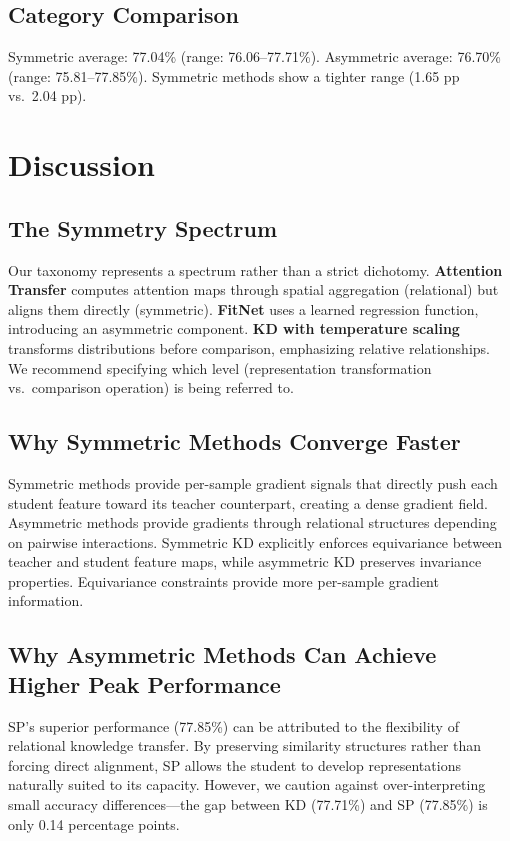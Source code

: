 \documentclass[symmetry,article,submit,moreauthors]{Definitions/mdpi}
\begin{document}
\subsection{Category Comparison}

Symmetric average: 77.04\% (range: 76.06--77.71\%). Asymmetric average: 76.70\% (range: 75.81--77.85\%). Symmetric methods show a tighter range (1.65 pp vs.\ 2.04 pp).

\section{Discussion}
\label{sec:discussion}

\subsection{The Symmetry Spectrum}

Our taxonomy represents a spectrum rather than a strict dichotomy. \textbf{Attention Transfer} computes attention maps through spatial aggregation (relational) but aligns them directly (symmetric). \textbf{FitNet} uses a learned regression function, introducing an asymmetric component. \textbf{KD with temperature scaling} transforms distributions before comparison, emphasizing relative relationships. We recommend specifying which level (representation transformation vs.\ comparison operation) is being referred to.

\subsection{Why Symmetric Methods Converge Faster}

Symmetric methods provide per-sample gradient signals that directly push each student feature toward its teacher counterpart, creating a dense gradient field. Asymmetric methods provide gradients through relational structures depending on pairwise interactions. Symmetric KD explicitly enforces equivariance between teacher and student feature maps, while asymmetric KD preserves invariance properties. Equivariance constraints provide more per-sample gradient information.

\subsection{Why Asymmetric Methods Can Achieve Higher Peak Performance}

SP's superior performance (77.85\%) can be attributed to the flexibility of relational knowledge transfer. By preserving similarity structures rather than forcing direct alignment, SP allows the student to develop representations naturally suited to its capacity. However, we caution against over-interpreting small accuracy differences---the gap between KD (77.71\%) and SP (77.85\%) is only 0.14 percentage points.
\end{document}
